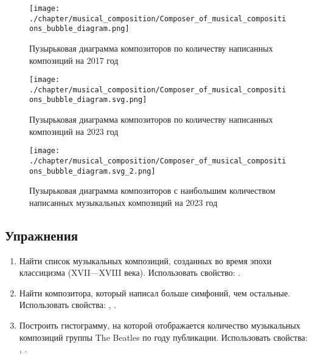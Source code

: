 \begin{figure*}
	\texttt{[image: ./chapter/musical\_composition/Composer\_of\_musical\_compositions\_bubble\_diagram.png]}
	\caption[Пузырьковая диаграмма композиторов по количеству написанных композиций на 2017 год]{Пузырьковая диаграмма композиторов по количеству написанных композиций на 2017 год}%
 	\label{fig:bubbleChart}%
\end{figure*}
\begin{figure*}
	\texttt{[image: ./chapter/musical\_composition/Composer\_of\_musical\_compositions\_bubble\_diagram.svg.png]}
	\caption[Пузырьковая диаграмма композиторов по количеству написанных композиций на 2023 год]{Пузырьковая диаграмма композиторов по количеству написанных композиций на 2023 год}%
	\label{fig:bubbleChart2}%
\end{figure*}

\begin{figure*}
	\texttt{[image: ./chapter/musical\_composition/Composer\_of\_musical\_compositions\_bubble\_diagram.svg\_2.png]}
	\caption[Пузырьковая диаграмма композиторов с наибольшим количеством написанных музыкальных композиций на 2023 год]{Пузырьковая диаграмма композиторов с наибольшим количеством написанных музыкальных композиций на 2023 год}%
	\label{fig:bubbleChart3}%
\end{figure*}

\newpage

\subsection{Упражнения}
\begin{enumerate}
\item Найти список музыкальных композиций, созданных во время эпохи классицизма (XVII—XVIII века).
Использовать свойство: .
\item Найти композитора, который написал больше симфоний, чем остальные.
Использовать свойства: , .
\item Построить гистограмму, на которой отображается количество музыкальных композиций группы The Beatles по году публикации.
Использовать свойства: , .
\end{enumerate}
